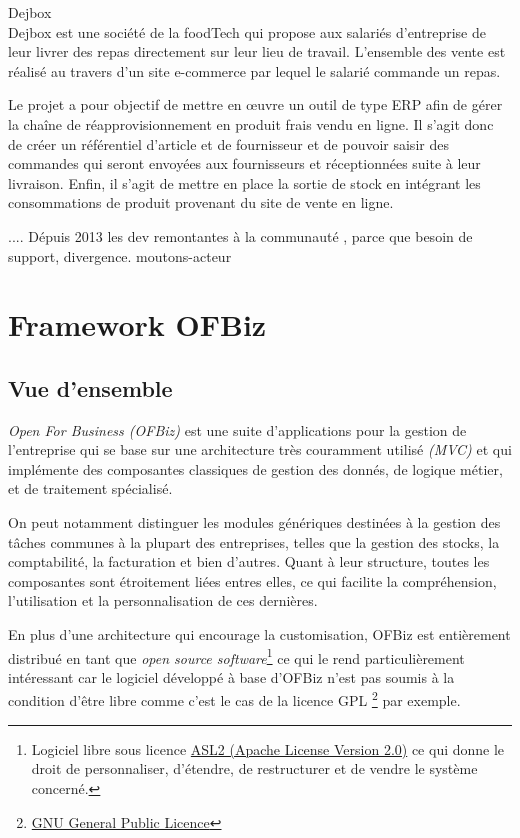 Dejbox
\\
Dejbox est une société de la foodTech qui propose aux salariés d’entreprise de leur livrer des repas directement sur leur lieu de travail. L’ensemble des vente est réalisé au travers d’un site e-commerce par lequel le salarié commande un repas.

Le projet a pour objectif de mettre en œuvre un outil de type ERP afin de gérer la chaîne de réapprovisionnement en produit frais vendu en ligne. Il s’agit donc de créer un référentiel d’article et de fournisseur et de pouvoir saisir des commandes qui seront envoyées aux fournisseurs et réceptionnées suite à leur livraison. Enfin, il s’agit de mettre en place la sortie de stock en intégrant les consommations de produit provenant du site de vente en ligne.


....
Dépuis 2013 les dev remontantes à la communauté , parce que besoin de support,  divergence. moutons-acteur 






\newpage
\section{Framework OFBiz}
\subsection{Vue d'ensemble }
\emph{Open For Business (OFBiz)} est une suite d'applications pour la gestion de l'entreprise qui se base sur une architecture très couramment utilisé \emph{(MVC)} et qui implémente des composantes classiques de gestion des donnés, de logique métier, et de traitement spécialisé. 

On peut notamment distinguer les modules génériques destinées à la gestion des tâches communes à la plupart des entreprises, telles que la gestion des stocks, la comptabilité, la facturation et bien d'autres. Quant à leur structure, toutes les composantes sont étroitement liées entres elles, ce qui facilite la compréhension, l'utilisation et la personnalisation de ces dernières. 


En plus d'une architecture qui encourage la customisation, OFBiz est entièrement distribué en tant que \emph{open source software}\footnote{Logiciel libre sous licence \href{https://www.apache.org/licenses/LICENSE-2.0.html}{ASL2 (Apache License Version 2.0)} ce qui donne le droit de personnaliser, d'étendre, de restructurer et de vendre le système concerné. } ce qui le rend particulièrement intéressant car le logiciel développé à base d'OFBiz n'est pas soumis à la condition d'être libre comme c'est le cas de la licence GPL  \footnote{\href{http://www.gnu.org/licenses/gpl-3.0.html}{GNU General Public Licence}} par exemple.

